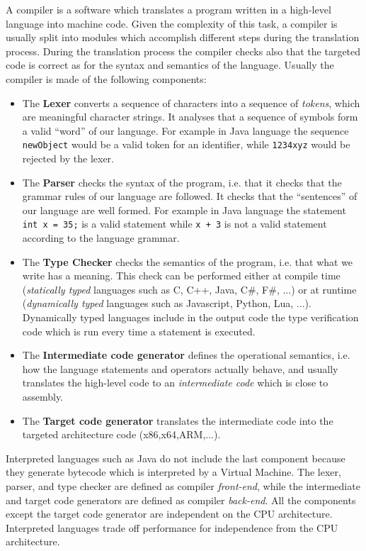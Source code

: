 A compiler is a software which translates a program written in a high-level language into machine code. Given the complexity of this task, a compiler is usually split into modules which accomplish different steps during the translation process. During the translation process the compiler checks also that the targeted code is correct as for the syntax and semantics of the language.
Usually the compiler is made of the following components:

\begin{itemize}
	\item The \textbf{Lexer} converts a sequence of characters into a sequence of \textit{tokens}, which are meaningful character strings. It analyses that a sequence of symbols form a valid ``word'' of our language. For example in Java language the sequence \texttt{newObject} would be a valid token for an identifier, while \texttt{1234xyz} would be rejected by the lexer.
	\item The \textbf{Parser} checks the syntax of the program, i.e. that it checks that the grammar rules of our language are followed. It checks that the ``sentences'' of our language are well formed. For example in Java language the statement \texttt{int x = 35;} is a valid statement while \texttt{x + 3} is not a valid statement according to the language grammar. 
	\item The \textbf{Type Checker} checks the semantics of the program, i.e. that what we write has a meaning. This check can be performed either at compile time (\textit{statically typed} languages such as C, C++, Java, C\#, F\#, ...) or at runtime (\textit{dynamically typed} languages such as Javascript, Python, Lua, ...). Dynamically typed languages include in the output code the type verification code which is run every time a statement is executed.
	\item The \textbf{Intermediate code generator} defines the operational semantics, i.e. how the language statements and operators actually behave, and usually translates the high-level code to an \textit{intermediate code} which is close to assembly.
	\item The \textbf{Target code generator} translates the intermediate code into the targeted architecture code (x86,x64,ARM,...).
\end{itemize}

Interpreted languages such as Java do not include the last component because they generate bytecode which is interpreted by a Virtual Machine. The lexer, parser, and type checker are defined as compiler \textit{front-end}, while the intermediate and target code generators are defined as compiler \textit{back-end}. All the components except the target code generator are independent on the CPU architecture. Interpreted languages trade off performance for independence from the CPU architecture.

